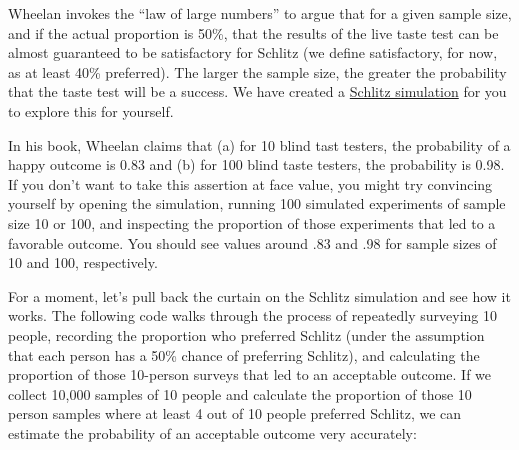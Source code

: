 \documentclass[
  openany]{book}
\begin{document}
Wheelan invokes the ``law of large numbers'' to argue that for a given sample size, and if the actual proportion is 50\%, that the results of the live taste test can be almost guaranteed to be satisfactory for Schlitz (we define satisfactory, for now, as at least 40\% preferred). The larger the sample size, the greater the probability that the taste test will be a success. We have created a \href{https://ybergner.shinyapps.io/Schlitz/}{Schlitz simulation} for you to explore this for yourself.

In his book, Wheelan claims that (a) for 10 blind tast testers, the probability of a happy outcome is 0.83 and (b) for 100 blind taste testers, the probability is 0.98. If you don't want to take this assertion at face value, you might try convincing yourself by opening the simulation, running 100 simulated experiments of sample size 10 or 100, and inspecting the proportion of those experiments that led to a favorable outcome. You should see values around .83 and .98 for sample sizes of 10 and 100, respectively.

For a moment, let's pull back the curtain on the Schlitz simulation and see how it works. The following code walks through the process of repeatedly surveying 10 people, recording the proportion who preferred Schlitz (under the assumption that each person has a 50\% chance of preferring Schlitz), and calculating the proportion of those 10-person surveys that led to an acceptable outcome. If we collect 10,000 samples of 10 people and calculate the proportion of those 10 person samples where at least 4 out of 10 people preferred Schlitz, we can estimate the probability of an acceptable outcome very accurately:
\end{document}
